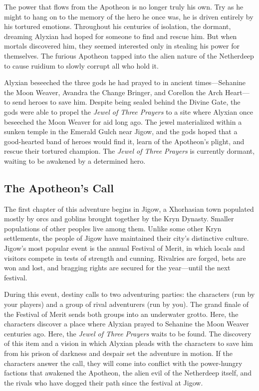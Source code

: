 \documentclass[10pt,a4paper,twoside,bg=print,twocolumn,openany,nodeprecatedcode]{dndbook}
\begin{document}
The power that flows from the Apotheon is no longer truly his own. Try as he might to hang on to the memory of the hero he once was, he is driven entirely by his tortured emotions. Throughout his centuries of isolation, the dormant, dreaming Alyxian had hoped for someone to find and rescue him. But when mortals discovered him, they seemed interested only in stealing his power for themselves. The furious Apotheon tapped into the alien nature of the Netherdeep to cause ruidium to slowly corrupt all who hold it.

Alyxian beseeched the three gods he had prayed to in ancient times—Sehanine the Moon Weaver, Avandra the Change Bringer, and Corellon the Arch Heart—to send heroes to save him. Despite being sealed behind the Divine Gate, the gods were able to propel the \textit{Jewel of Three Prayers} to a site where Alyxian once beseeched the Moon Weaver for aid long ago. The jewel materialized within a sunken temple in the Emerald Gulch near Jigow, and the gods hoped that a good-hearted band of heroes would find it, learn of the Apotheon's plight, and rescue their tortured champion. The \textit{Jewel of Three Prayers} is currently dormant, waiting to be awakened by a determined hero.

\subsection{The Apotheon's Call}
The first chapter of this adventure begins in Jigow, a Xhorhasian town populated mostly by orcs and goblins brought together by the Kryn Dynasty. Smaller populations of other peoples live among them. Unlike some other Kryn settlements, the people of Jigow have maintained their city's distinctive culture. Jigow's most popular event is the annual Festival of Merit, in which locals and visitors compete in tests of strength and cunning. Rivalries are forged, bets are won and lost, and bragging rights are secured for the year—until the next festival.

During this event, destiny calls to two adventuring parties: the characters (run by your players) and a group of rival adventurers (run by you). The grand finale of the Festival of Merit sends both groups into an underwater grotto. Here, the characters discover a place where Alyxian prayed to Sehanine the Moon Weaver centuries ago. Here, the \textit{Jewel of Three Prayers} waits to be found. The discovery of this item and a vision in which Alyxian pleads with the characters to save him from his prison of darkness and despair set the adventure in motion. If the characters answer the call, they will come into conflict with the power-hungry factions that awakened the Apotheon, the alien evil of the Netherdeep itself, and the rivals who have dogged their path since the festival at Jigow.
\end{document}
